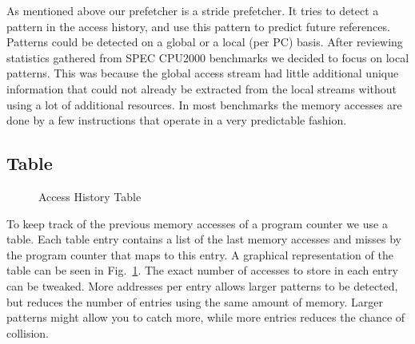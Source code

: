 As mentioned above our prefetcher is a stride prefetcher. It tries to detect a 
pattern in the access history, and use this pattern to predict future 
references. Patterns could be detected on a global or a local (per PC) basis.
After reviewing statistics gathered from SPEC CPU2000 benchmarks we decided to 
focus on local patterns. This was because the global access stream had little 
additional unique information that could not already be extracted from the 
local streams without using a lot of additional resources. In most benchmarks 
the memory accesses are done by a few instructions that operate in a very 
predictable fashion.

\subsection{Table}

\begin{figure}
	\caption{Access History Table}
	\label{fig:table}
\end{figure}

To keep track of the previous memory accesses of a program counter we use a
table. Each table entry contains a list of the last memory accesses
and misses by the program counter that maps to this entry.
A graphical representation of the table can be seen in Fig.~\ref{fig:table}.
The exact number of accesses to store in each entry can be tweaked.
More addresses per entry allows larger patterns to be detected,
but reduces the number of entries using the same amount of memory.
Larger patterns might allow you to catch more, while more entries
reduces the chance of collision.


